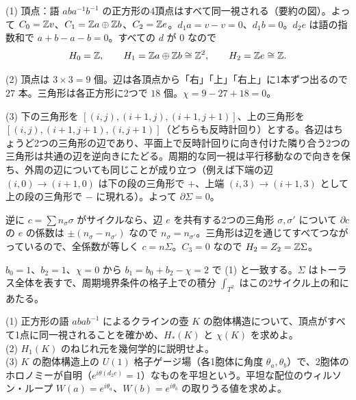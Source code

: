 \begin{solution}
(1) 頂点：語 $aba^{-1}b^{-1}$ の正方形の4頂点はすべて同一視される（要約の図）。よって $C_0=\mathbb{Z} v$、$C_1=\mathbb{Z} a\oplus\mathbb{Z} b$、$C_2=\mathbb{Z} e$。$d_1a=v-v=0$、$d_1b=0$。$d_2e$ は語の指数和で $a+b-a-b=0$。すべての $d$ が $0$ なので
\[
H_0=\mathbb{Z},\qquad H_1=\mathbb{Z} a\oplus\mathbb{Z} b\cong\mathbb{Z}^2,\qquad H_2=\mathbb{Z} e\cong\mathbb{Z} .
\]

(2) 頂点は $3\times3=9$ 個。辺は各頂点から「右」「上」「右上」に1本ずつ出るので $27$ 本。三角形は各正方形に2つで $18$ 個。$\chi=9-27+18=0$。

(3) 下の三角形を $[(i,j),(i+1,j),(i+1,j+1)]$、上の三角形を $[(i,j),(i+1,j+1),(i,j+1)]$（どちらも反時計回り）とする。各辺はちょうど2つの三角形の辺であり、平面上で反時計回りに向き付けた隣り合う2つの三角形は共通の辺を逆向きにたどる。周期的な同一視は平行移動なので向きを保ち、外周の辺についても同じことが成り立つ（例えば下端の辺 $(i,0)\to(i+1,0)$ は下の段の三角形で $+$、上端 $(i,3)\to(i+1,3)$ として上の段の三角形で $-$ に現れる）。よって $\partial\Sigma=0$。

逆に $c=\sum n_\sigma\sigma$ がサイクルなら、辺 $e$ を共有する2つの三角形 $\sigma,\sigma'$ について $\partial c$ の $e$ の係数は $\pm(n_\sigma-n_{\sigma'})$ なので $n_\sigma=n_{\sigma'}$。三角形は辺を通じてすべてつながっているので、全係数が等しく $c=n\Sigma$。$C_3=0$ なので $H_2=Z_2=\mathbb{Z}\Sigma$。

$b_0=1$、$b_2=1$、$\chi=0$ から $b_1=b_0+b_2-\chi=2$ で (1) と一致する。$\Sigma$ はトーラス全体を表すで、周期境界条件の格子上での積分 $\int_{T^2}$ はこの2サイクル上の和にあたる。
\end{solution}

\begin{problem}[難易度 B]\label{ch04-prob-klein}
(1) 正方形の語 $abab^{-1}$ によるクラインの壺 $K$ の胞体構造について、頂点がすべて1点に同一視されることを確かめ、$H_*(K)$ と $\chi(K)$ を求めよ。\\
(2) $H_1(K)$ のねじれ元を幾何学的に説明せよ。\\
(3) $K$ の胞体構造上の $U(1)$ 格子ゲージ場（各1胞体に角度 $\theta_a,\theta_b$）で、2胞体のホロノミーが自明（$e^{i\theta(d_2e)}=1$）なものを平坦という。平坦な配位のウィルソン・ループ $W(a)=e^{i\theta_a}$、$W(b)=e^{i\theta_b}$ の取りうる値を求めよ。
\end{problem}

